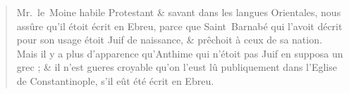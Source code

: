 
\begin{quotation}
Mr.~le~Moine habile Protestant \& savant dans les langues Orientales, nous assûre qu'il étoit écrit en Ebreu, parce que Saint~Barnabé qui l'avoit décrit pour son usage étoit Juif de naissance, \& prêchoit à ceux de sa nation. Mais il y a plus d'apparence qu'Anthime qui n'étoit pas Juif en supposa un grec ; \& il n'est gueres croyable qu'on l'eust lû publiquement dans l'Eglise de Constantinople, s'il eût été écrit en Ebreu.
\end{quotation}